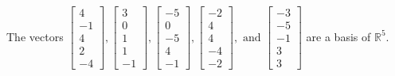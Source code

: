 \begin{exercise}
\begin{exerciseStatement}
  \end{exerciseStatement}
  \begin{exerciseAnswer}
   The vectors \(\left[\begin{array}{r}
4 \\
-1 \\
4 \\
2 \\
-4
\end{array}\right] , \left[\begin{array}{r}
3 \\
0 \\
1 \\
1 \\
-1
\end{array}\right] , \left[\begin{array}{r}
-5 \\
0 \\
-5 \\
4 \\
-1
\end{array}\right] , \left[\begin{array}{r}
-2 \\
4 \\
4 \\
-4 \\
-2
\end{array}\right] , \text{ and } \left[\begin{array}{r}
-3 \\
-5 \\
-1 \\
3 \\
3
\end{array}\right]\) 
  	 are  a basis of \(\mathbb{R}^5\).
  


  \end{exerciseAnswer}
\end{exercise}